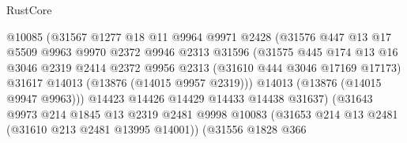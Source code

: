 \begin{lexlean}{RustCore}
\begin{coremodule}
                                    @10085
                                    (@31567
                                      @1277
                                      @18
                                      @11
                                      @9964
                                      @9971
                                      @2428
                                      (@31576
                                        @447
                                        @13
                                        @17
                                        @5509
                                        @9963
                                        @9970
                                        @2372
                                        @9946
                                        @2313
                                        @31596
                                        (@31575
                                          @445
                                          @174
                                          @13
                                          @16
                                          @3046
                                          @2319
                                          @2414
                                          @2372
                                          @9956
                                          @2313
                                          (@31610 @444 @3046 @17169 @17173)
                                          @31617
                                          @14013
                                          (@13876 (@14015 @9957 @2319)))
                                        @14013
                                        (@13876 (@14015 @9947 @9963)))
                                      @14423
                                      @14426
                                      @14429
                                      @14433
                                      @14438
                                      @31637)
                                    (@31643
                                      @9973
                                      @214
                                      @1845
                                      @13
                                      @2319
                                      @2481
                                      @9998
                                      @10083
                                      (@31653 @214 @13 @2481 (@31610 @213 @2481 @13995 @14001))
                                      (@31556
                                        @1828
                                        @366

\end{coremodule}
\end{lexlean}
